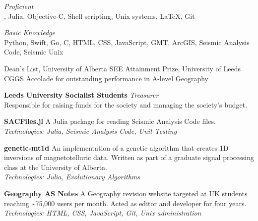 \documentclass[11pt]{article}
\begin{document}
\bigskip

%
\emph{Proficient}\\
\ML, Julia, Objective-C, Shell scripting, Unix systems, \LaTeX, Git

\medskip

\emph{Basic Knowledge}\\
Python, Swift, Go, C, HTML, CSS, JavaScript, GMT, ArcGIS, Seismic Analysis Code,
Seismic Unix

\bigskip

%
Dean's List, University of Alberta  \newline
SEE Attainment Prize, University of Leeds  \newline
CGGS Accolade for outstanding performance in A-level Geography 

\bigskip

%
\textbf{Leeds University Socialist Students}  \newline
\emph{Treasurer}\\
Responsible for raising funds for the society and managing the society's budget.

\bigskip

%
\textbf{SACFiles.jl}  \newline
A Julia package for reading Seismic Analysis Code files. \\
\emph{Technologies: Julia, Seismic Analysis Code, Unit Testing}

\medskip
\textbf{genetic-mt1d}  \newline
An implementation of a genetic algorithm that creates 1D inversions of
magnetotelluric data. Written as part of a graduate signal processing class at
the University of Alberta. \\
\emph{Technologies: Julia, Evolutionary Algorithms}

\medskip
\textbf{Geography AS Notes}  \newline
A Geography revision website targeted at UK students reaching
\textasciitilde{}75,000 users per month. Acted as editor and developer for
four years. \\
\emph{Technologies: HTML, CSS, JavaScript, Git, Unix administration}
\end{document}
